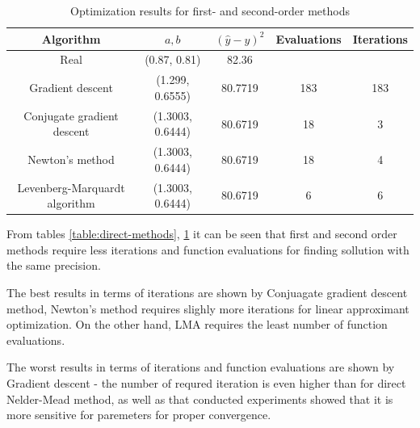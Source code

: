 \begin{table}[h!]
    \begin{center}
        \caption{Optimization results for first- and second-order methods}
        \label{table:high-order-methods}
        \begin{tabular}{|c|c|c|c|c|}
            \textbf{Algorithm} & \textbf{$a, b$} & \textbf{$(\hat{y} - y)^2$} & \textbf{Evaluations} & \textbf{Iterations}\\
            \hline
            Real & (0.87, 0.81) & 82.36 & &\\
            Gradient descent & (1.299, 0.6555) & 80.7719 & 183 & 183 \\
            Conjugate gradient descent & (1.3003, 0.6444) & 80.6719 & 18 & 3 \\
            Newton's method & (1.3003, 0.6444) & 80.6719 & 18 & 4 \\
            Levenberg-Marquardt algorithm & (1.3003, 0.6444) & 80.6719 & 6 & 6 \\
        \end{tabular}
    \end{center}
\end{table}

From tables \ref{table:direct-methods}, \ref{table:high-order-methods} it can be seen that first and second order methods
require less iterations and function evaluations for finding sollution with the same precision. 

The best results in terms of iterations are shown by Conjuagate gradient descent method, Newton's method requires slighly more iterations for linear approximant optimization. On the other hand, LMA requires the least number of function evaluations.

The worst results in terms of iterations and function evaluations are shown by Gradient descent - the number of requred iteration is even higher than for direct Nelder-Mead method, as well as that
conducted experiments showed that it is more sensitive for paremeters for proper convergence.